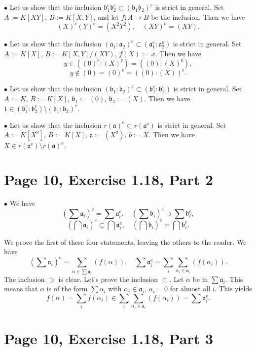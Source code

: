 \documentclass[12pt]{article}
\newcommand{\oo}{\operatorname}
\newcommand{\mf}{\mathfrak}
\newcommand{\bu}{\bullet}
\begin{document}
$\bu$ Let us show that the inclusion $\mf b_1^{\oo c}\mf b_2^{\oo c}\subset(\mf b_1\mf b_2)^{\oo c}$ is strict in general. Set $A:=K[XY]$, $B:=K[X,Y]$, and let $f:A\to B$ be the inclusion. Then we have 
$$
(X)^{\oo c}(Y)^{\oo c}=(X^2Y^2),\quad(XY)^{\oo c}=(XY).
$$

$\bu$ Let us show that the inclusion $(\mf a_1:\mf a_2)^{\oo e}\subset(\mf a_1^{\oo e}:\mf a_2^{\oo e})$ is strict in general. Set $A:=K[X]$, $B:=K[X,Y]/(XY)$, $f(X):=x$. Then we have 
$$
y\in((0)^{\oo e}:(X)^{\oo e})=((0):(X)^{\oo e}),
$$ 
$$y\notin(0)=(0)^{\oo e}=((0):(X))^{\oo e}.$$

$\bu$ Let us show that the inclusion $(\mf b_1:\mf b_2)^{\oo c}\subset(\mf b_1^{\oo c}:\mf b_2^{\oo c})$ is strict in general. Set $A:=K$, $B:=K[X]$, $\mf b_1:=(0)$, $\mf b_2:=(X)$. Then we have $1\in(\mf b_1^{\oo c}:\mf b_2^{\oo c})\setminus(\mf b_1:\mf b_2)^{\oo c}$.

$\bu$ Let us show that the inclusion $r(\mf a)^{\oo e}\subset r(\mf a^{\oo e})$ is strict in general. Set $A:=K[X^2]$, $B:=K[X]$, $\mf a:=(X^2)$, $b:=X$. Then we have $X\in r(\mf a^{\oo e})\setminus r(\mf a)^{\oo e}$.

\section{Page 10, Exercise 1.18, Part 2}%

$\bu$ We have 
$$
\left(\sum\mf a_i\right)^{\oo e}=\sum\mf a_i^{\oo e},\quad\left(\sum\mf b_i\right)^{\oo c}\supset\sum\mf b_i^{\oo c},
$$
$$
\left(\bigcap\mf a_i\right)^{\oo e}\subset\bigcap\mf a_i^{\oo e},\quad\left(\bigcap\mf b_i\right)^{\oo c}=\bigcap\mf b_i^{\oo c}.
$$

We prove the first of these four statements, leaving the others to the reader. We have 
$$
\left(\sum\mf a_i\right)^{\oo e}=\sum_{\alpha\in\sum\mf a_i}(f(\alpha)),\quad\sum\mf a_i^{\oo e}=\sum_i\sum_{\alpha_i\in\mf a_i}(f(\alpha_i)).
$$ 
The inclusion $\supset$ is clear. Let's prove the inclusion $\subset$. Let $\alpha$ be in $\sum\mf a_i$. This means that $\alpha$ is of the form $\sum\alpha_i$ with $\alpha_i\in\mf a_i$, $\alpha_i=0$ for almost all $i$. This yields 
$$
f(\alpha)=\sum_if(\alpha_i)\in\sum_i\sum_{\alpha_i\in\mf a_i}(f(\alpha_i))=\sum\mf a_i^{\oo e}.
$$ 

\section{Page 10, Exercise 1.18, Part 3}%
\end{document}
